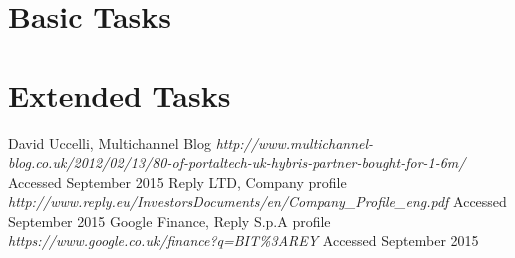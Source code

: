 \documentclass[titlepage]{article}
\begin{document}
\section{Basic Tasks}

\section{Extended Tasks}







 \begin{thebibliography}{1}
 	
 	 David Uccelli, Multichannel Blog {\em http://www.multichannel-blog.co.uk/2012/02/13/80-of-portaltech-uk-hybris-partner-bought-for-1-6m/} Accessed September 2015
 	 Reply LTD, Company profile {\em http://www.reply.eu/InvestorsDocuments/en/Company\_Profile\_eng.pdf} Accessed September 2015
 	 Google Finance, Reply S.p.A profile {\em https://www.google.co.uk/finance?q=BIT\%3AREY} Accessed September 2015
 	
 	
 	
 	
 		

	


 \end{thebibliography}
\end{document}
